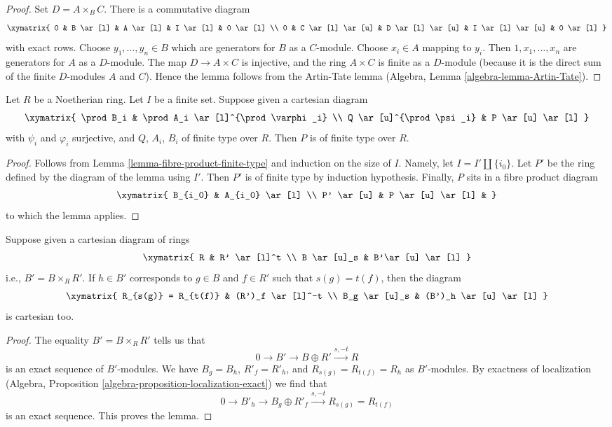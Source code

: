 \begin{proof}
Set $D = A \times_B C$. There is a commutative diagram
$$
\xymatrix{
0 &
B \ar[l] &
A \ar[l] &
I \ar[l] &
0 \ar[l] \\
0 &
C \ar[l] \ar[u] &
D \ar[l] \ar[u] &
I \ar[l] \ar[u] &
0 \ar[l]
}
$$
with exact rows. Choose $y_1, \ldots, y_n \in B$ which are generators for
$B$ as a $C$-module. Choose $x_i \in A$ mapping to $y_i$.
Then $1, x_1, \ldots, x_n$ are generators for $A$ as a $D$-module.
The map $D \to A \times C$ is injective, and the ring $A \times C$ is finite
as a $D$-module (because it is the direct sum of the finite $D$-modules
$A$ and $C$). Hence the lemma follows from the Artin-Tate lemma
(Algebra, Lemma \ref{algebra-lemma-Artin-Tate}).
\end{proof}

\begin{lemma}
\label{lemma-formal-consequence}
Let $R$ be a Noetherian ring. Let $I$ be a finite set. Suppose given a
cartesian diagram
$$
\xymatrix{
\prod B_i &
\prod A_i \ar[l]^{\prod \varphi_i} \\
Q \ar[u]^{\prod \psi_i} &
P \ar[u] \ar[l]
}
$$
with $\psi_i$ and $\varphi_i$ surjective, and $Q$, $A_i$, $B_i$ of
finite type over $R$. Then $P$ is of finite type over $R$.
\end{lemma}

\begin{proof}
Follows from Lemma \ref{lemma-fibre-product-finite-type}
and induction on the size of $I$.
Namely, let $I = I' \amalg \{i_0\}$. Let $P'$ be the ring defined
by the diagram of the lemma using $I'$. Then $P'$ is of finite type
by induction hypothesis. Finally, $P$ sits in a fibre product diagram
$$
\xymatrix{
B_{i_0} &
A_{i_0} \ar[l] \\
P' \ar[u] &
P \ar[u] \ar[l] &
}
$$
to which the lemma applies.
\end{proof}

\begin{lemma}
\label{lemma-diagram-localize}
Suppose given a cartesian diagram of rings
$$
\xymatrix{
R &
R' \ar[l]^t \\
B \ar[u]_s &
B'\ar[u] \ar[l]
}
$$
i.e., $B' = B \times_R R'$. If $h \in B'$ corresponds to $g \in B$
and $f \in R'$ such that $s(g) = t(f)$, then the diagram
$$
\xymatrix{
R_{s(g)} = R_{t(f)} &
(R')_f \ar[l]^-t \\
B_g \ar[u]_s &
(B')_h \ar[u] \ar[l]
}
$$
is cartesian too.
\end{lemma}

\begin{proof}
The equality $B' = B \times_R R'$ tells us that
$$
0 \to B' \to B \oplus R' \xrightarrow{s, -t} R
$$
is an exact sequence of $B'$-modules. We have $B_g = B_h$,
$R'_f = R'_h$, and $R_{s(g)} = R_{t(f)} = R_h$ as $B'$-modules.
By exactness of localization
(Algebra, Proposition \ref{algebra-proposition-localization-exact})
we find that
$$
0 \to B'_h \to B_g \oplus R'_f \xrightarrow{s, -t} R_{s(g)} = R_{t(f)}
$$
is an exact sequence. This proves the lemma.
\end{proof}

